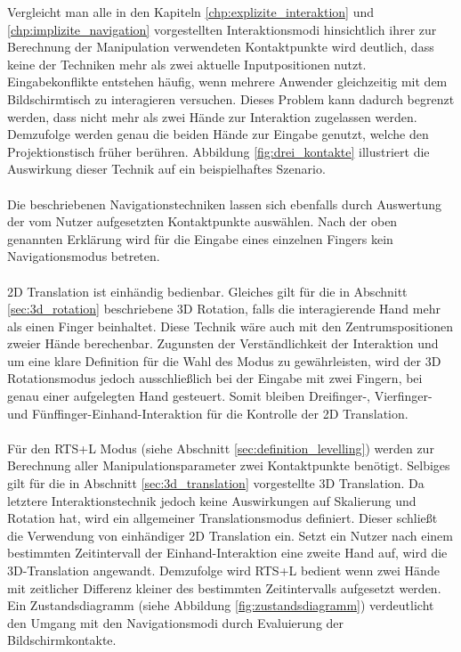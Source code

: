 Vergleicht man alle in den Kapiteln \ref{chp:explizite_interaktion} und \ref{chp:implizite_navigation} vorgestellten Interaktionsmodi hinsichtlich ihrer zur Berechnung der Manipulation verwendeten Kontaktpunkte wird deutlich, dass keine der Techniken mehr als zwei aktuelle Inputpositionen nutzt. Eingabekonflikte entstehen häufig, wenn mehrere Anwender gleichzeitig mit dem Bildschirmtisch zu interagieren versuchen. Dieses Problem kann dadurch begrenzt werden, dass nicht mehr als zwei Hände zur Interaktion zugelassen werden. Demzufolge werden genau die beiden Hände zur Eingabe genutzt, welche den Projektionstisch früher berühren. Abbildung \ref{fig:drei_kontakte} illustriert die Auswirkung dieser Technik auf ein beispielhaftes Szenario.
\\\\
Die beschriebenen Navigationstechniken lassen sich ebenfalls durch Auswertung der vom Nutzer aufgesetzten Kontaktpunkte auswählen. Nach der oben genannten Erklärung wird für die Eingabe eines einzelnen Fingers kein Navigationsmodus betreten.
\\\\
2D Translation ist einhändig bedienbar. Gleiches gilt für die in Abschnitt \ref{sec:3d_rotation} beschriebene 3D Rotation, falls die interagierende Hand mehr als einen Finger beinhaltet. Diese Technik wäre auch mit den Zentrumspositionen zweier Hände berechenbar. Zugunsten der Verständlichkeit der Interaktion und um eine klare Definition für die Wahl des Modus zu gewährleisten, wird der 3D Rotationsmodus jedoch ausschließlich bei der Eingabe mit zwei Fingern, bei genau einer aufgelegten Hand gesteuert. Somit bleiben Dreifinger-, Vierfinger- und Fünffinger-Einhand-Interaktion für die Kontrolle der 2D Translation.
\\\\
Für den RTS+L Modus (siehe Abschnitt \ref{sec:definition_levelling}) werden zur Berechnung aller Manipulationsparameter zwei Kontaktpunkte benötigt. Selbiges gilt für die in Abschnitt \ref{sec:3d_translation} vorgestellte 3D Translation. Da letztere Interaktionstechnik jedoch keine Auswirkungen auf Skalierung und Rotation hat, wird ein allgemeiner Translationsmodus definiert. Dieser schließt die Verwendung von einhändiger 2D Translation ein. Setzt ein Nutzer nach einem bestimmten Zeitintervall der Einhand-Interaktion eine zweite Hand auf, wird die  3D-Translation angewandt. Demzufolge wird RTS+L bedient wenn zwei Hände mit zeitlicher Differenz kleiner des bestimmten Zeitintervalls aufgesetzt werden. Ein Zustandsdiagramm (siehe Abbildung \ref{fig:zustandsdiagramm}) verdeutlicht den Umgang mit den Navigationsmodi durch Evaluierung der Bildschirmkontakte.


